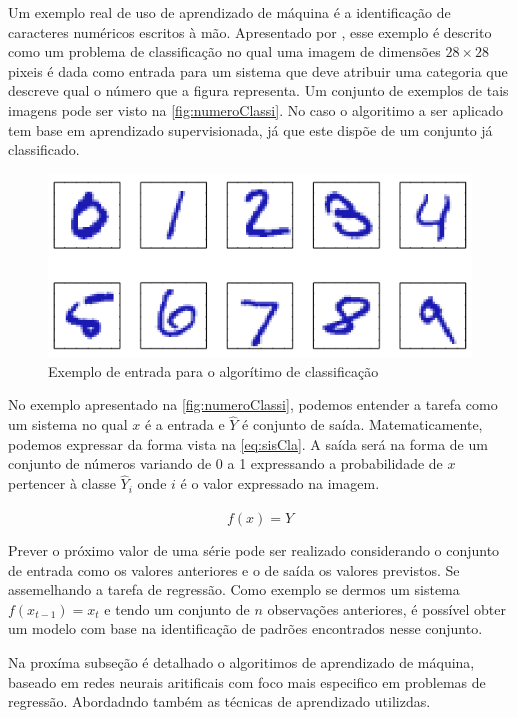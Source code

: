\documentclass[
    12pt,
    oneside,
    a4paper,
    english,
    brazil
]{abntex2}
\begin{document}
Um    exemplo   real    de    uso    de   aprendizado    de    máquina   é    a
identificação  de   caracteres  numéricos  escritos  à   mão.  Apresentado  por
,  esse  exemplo é  descrito  como  um problema  de
classificação no qual uma imagem de dimensões $28 \times 28$ pixeis é dada como
entrada para  um sistema que  deve atribuir uma  categoria que descreve  qual o
número que  a figura representa. Um  conjunto de exemplos de  tais imagens pode
ser visto  na \autoref{fig:numeroClassi}. No  caso o algoritimo a  ser aplicado
tem base  em aprendizado supervisionada, já  que este dispõe de  um conjunto já
classificado.

\begin{figure}[ht]
    \centering
    \caption{Exemplo de entrada para o algorítimo de
        classificação}\label{fig:numeroClassi}
    \includegraphics[width=.5\linewidth]{images/numeroClassificacao.png}
\end{figure}

No exemplo apresentado na \autoref{fig:numeroClassi}, podemos entender a tarefa
como  um sistema  no qual  $x$ é  a entrada  e $\hat{Y}$  é conjunto  de saída.
Matematicamente,  podemos expressar  da forma  vista na  \autoref{eq:sisCla}. A
saída será na forma  de um conjunto de números variando de 0  a 1 expressando a
probabilidade  de  $x$ pertencer  à  classe  $\hat{Y}_i$  onde  $i$ é  o  valor
expressado na imagem.

\begin{equation}
    \label{eq:sisCla}
    f(x) = \hat{Y}
\end{equation}

Prever o próximo valor de uma  série pode ser realizado considerando o conjunto
de entrada  como os valores  anteriores e o de  saída os valores  previstos. Se
assemelhando  a  tarefa  de  regressão.  Como  exemplo  se  dermos  um  sistema
$f{(x_{t-1})}  = x_t$  e tendo  um conjunto  de $n$  observações anteriores,  é
possível obter um modelo com base na identificação de padrões encontrados nesse
conjunto.

Na  proxíma subseção  é  detalhado  o algoritimos  de  aprendizado de  máquina,
baseado em redes  neurais aritificais com foco mais especifico  em problemas de
regressão. Abordadndo também as técnicas de aprendizado utilizdas.
\end{document}
